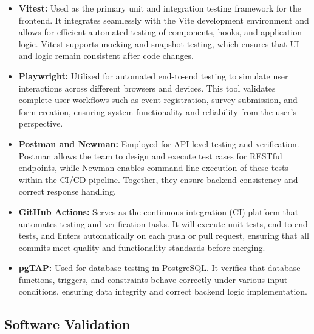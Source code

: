 \documentclass[12pt, titlepage]{article}
\begin{document}
\begin{itemize}
    \item \textbf{Vitest:} Used as the primary unit and integration testing framework for the frontend. It integrates seamlessly with the Vite development environment and allows for efficient automated testing of components, hooks, and application logic. Vitest supports mocking and snapshot testing, which ensures that UI and logic remain consistent after code changes.

    \item \textbf{Playwright:} Utilized for automated end-to-end testing to simulate user interactions across different browsers and devices. This tool validates complete user workflows such as event registration, survey submission, and form creation, ensuring system functionality and reliability from the user's perspective.

    \item \textbf{Postman and Newman:} Employed for API-level testing and verification. Postman allows the team to design and execute test cases for RESTful endpoints, while Newman enables command-line execution of these tests within the CI/CD pipeline. Together, they ensure backend consistency and correct response handling.

    \item \textbf{GitHub Actions:} Serves as the continuous integration (CI) platform that automates testing and verification tasks. It will execute unit tests, end-to-end tests, and linters automatically on each push or pull request, ensuring that all commits meet quality and functionality standards before merging.

    \item \textbf{pgTAP:} Used for database testing in PostgreSQL. It verifies that database functions, triggers, and constraints behave correctly under various input conditions, ensuring data integrity and correct backend logic implementation.
\end{itemize}

\subsection{Software Validation}


\end{document}
